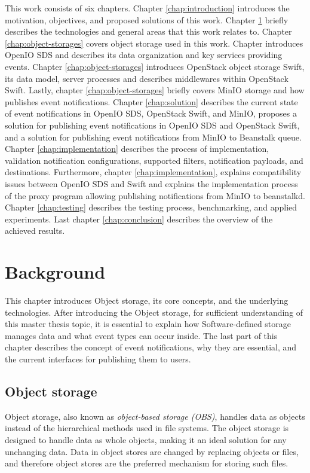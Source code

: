This work consists of six chapters. Chapter \ref{chap:introduction} introduces the motivation, objectives, and proposed solutions of this work. Chapter \ref{chap:background} briefly describes the technologies and general areas that this work relates to. Chapter \ref{chap:object-storages} covers object storage used in this work. Chapter introduces OpenIO SDS and describes its data organization and key services providing events. Chapter \ref{chap:object-storages} introduces OpenStack object storage Swift, its data model, server processes and describes middlewares within OpenStack Swift. Lastly, chapter \ref{chap:object-storages} briefly covers MinIO storage and how publishes event notifications. Chapter \ref{chap:solution} describes the current state of event notifications in OpenIO SDS, OpenStack Swift, and MinIO, proposes a solution for publishing event notifications in OpenIO SDS and OpenStack Swift, and a solution for publishing event notifications from MinIO to Beanstalk queue. Chapter \ref{chap:implementation} describes the process of implementation, validation notification configurations, supported filters, notification payloads, and destinations. Furthermore, chapter \ref{chap:implementation}, explains compatibility issues between OpenIO SDS and Swift and explains the implementation process of the proxy program allowing publishing notifications from MinIO to beanstalkd. Chapter \ref{chap:testing} describes the testing process, benchmarking, and applied experiments. Last chapter \ref{chap:conclusion} describes the overview of the achieved results.


\chapter{Background}\label{chap:background}

    This chapter introduces Object storage, its core concepts, and the underlying technologies. After introducing the Object storage, for sufficient understanding of this master thesis topic, it is essential to explain how Software-defined storage manages data and what event types can occur inside. The last part of this chapter describes the concept of event notifications, why they are essential, and the current interfaces for publishing them to users.

\section{Object storage}
    Object storage, also known as \textit{object-based storage (OBS)}, handles data as objects instead of the hierarchical methods used in file systems\cite{objectBasedStorage}. The object storage is designed to handle data as whole objects, making it an ideal solution for any unchanging data. Data in object stores are changed by replacing objects or files, and therefore object stores are the preferred mechanism for storing such files\cite{networkStorage}.

